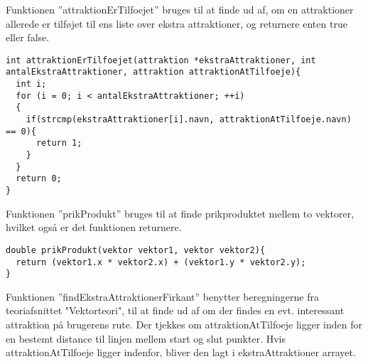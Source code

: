 Funktionen ”attraktionErTilfoejet” bruges til at finde ud af, om en attraktioner allerede er tilføjet til ens liste over ekstra attraktioner, og returnere enten true eller false. \newline

\begin{lstlisting}
int attraktionErTilfoejet(attraktion *ekstraAttraktioner, int antalEkstraAttraktioner, attraktion attraktionAtTilfoeje){
  int i;
  for (i = 0; i < antalEkstraAttraktioner; ++i)
  {
    if(strcmp(ekstraAttraktioner[i].navn, attraktionAtTilfoeje.navn) == 0){
      return 1;
    }
  }
  return 0;
}
\end{lstlisting}

Funktionen ”prikProdukt” bruges til at finde prikproduktet mellem to vektorer, hvilket også er det funktionen returnere. \newline

\begin{lstlisting}
double prikProdukt(vektor vektor1, vektor vektor2){
  return (vektor1.x * vektor2.x) + (vektor1.y * vektor2.y);
}
\end{lstlisting}

Funktionen ”findEkstraAttraktionerFirkant” benytter beregningerne fra teoriafsnittet "Vektorteori", til at finde ud af om der findes en evt. interessant attraktion på brugerens rute. Der tjekkes om attraktionAtTilfoeje ligger inden for en bestemt distance til linjen mellem start og slut punkter. Hvis attraktionAtTilfoeje ligger indenfor, bliver den lagt i ekstraAttraktioner arrayet. \newline

